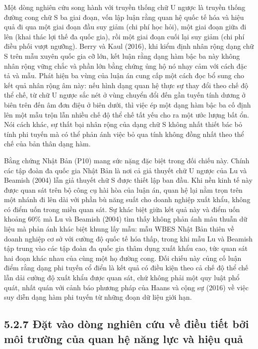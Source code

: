 \documentclass[
  a4paper,
  13pt]{extreport}
\begin{document}
Một dòng nghiên cứu song hành với truyền thống chữ U ngược là truyền
thống đường cong chữ S ba giai đoạn, vốn lập luận rằng quan hệ quốc tế
hóa và hiệu quả đi qua một giai đoạn đầu suy giảm (chi phí học hỏi), một
giai đoạn giữa đi lên (khai thác lợi thế đa quốc gia), rồi một giai đoạn
cuối lại suy giảm (chi phí điều phối vượt ngưỡng). Berry và Kaul (2016),
khi kiểm định nhân rộng dạng chữ S trên mẫu xuyên quốc gia cỡ lớn, kết
luận rằng dạng hàm bậc ba này không nhân rộng vững chắc và phần lớn bằng
chứng ủng hộ nó nhạy cảm với cách đặc tả và mẫu. Phát hiện ba vùng của
luận án cung cấp một cách đọc bổ sung cho kết quả nhân rộng âm này: nếu
hình dạng quan hệ thực sự thay đổi theo chế độ thể chế, từ chữ U ngược
sắc nét ở vùng chuyển đổi đến gần tuyến tính dương ở biên trên đến âm
đơn điệu ở biên dưới, thì việc ép một dạng hàm bậc ba cố định lên một
mẫu trộn lẫn nhiều chế độ thể chế tất yếu cho ra một ước lượng bất ổn.
Nói cách khác, sự thất bại nhân rộng của dạng chữ S không nhất thiết bác
bỏ tính phi tuyến mà có thể phản ánh việc bỏ qua tính không đồng nhất
theo thể chế của bản thân dạng hàm.

Bằng chứng Nhật Bản (P10) mang sức nặng đặc biệt trong đối chiếu này.
Chính các tập đoàn đa quốc gia Nhật Bản là nơi cả giả thuyết chữ U ngược
của Lu và Beamish (2004) lẫn giả thuyết chữ S được thiết lập ban đầu.
Khi nền kinh tế này được quan sát trên bộ công cụ hài hòa của luận án,
quan hệ lại nằm trọn trên một nhánh đi lên dài với phần bù năng suất cho
doanh nghiệp xuất khẩu, không có điểm uốn trong miền quan sát. Sự khác
biệt giữa kết quả này và điểm uốn khoảng 60\% mà Lu và Beamish (2004)
tìm thấy không phản ánh mâu thuẫn dữ liệu mà phản ánh khác biệt khung
lấy mẫu: mẫu WBES Nhật Bản thiên về doanh nghiệp cơ sở với cường độ quốc
tế hóa thấp, trong khi mẫu Lu và Beamish tập trung vào các tập đoàn đa
quốc gia thâm dụng xuất khẩu cao, tức quan sát hai đoạn khác nhau của
cùng một họ đường cong. Đối chiếu này củng cố luận điểm rằng dạng phi
tuyến cổ điển là kết quả có điều kiện theo cả chế độ thể chế lẫn dải
cường độ xuất khẩu được quan sát, chứ không phải một quy luật phổ quát,
nhất quán với cảnh báo phương pháp của Haans và cộng sự (2016) về việc
suy diễn dạng hàm phi tuyến từ những đoạn dữ liệu giới hạn.

\hypertarget{ux111ux1eb7t-vuxe0o-duxf2ng-nghiuxean-cux1ee9u-vux1ec1-ux111iux1ec1u-tiux1ebft-bux1edfi-muxf4i-trux1b0ux1eddng-cux1ee7a-quan-hux1ec7-nux103ng-lux1ef1c-vuxe0-hiux1ec7u-quux1ea3}{%
\subsection{5.2.7 Đặt vào dòng nghiên cứu về điều tiết bởi môi trường
của quan hệ năng lực và hiệu
quả}\label{ux111ux1eb7t-vuxe0o-duxf2ng-nghiuxean-cux1ee9u-vux1ec1-ux111iux1ec1u-tiux1ebft-bux1edfi-muxf4i-trux1b0ux1eddng-cux1ee7a-quan-hux1ec7-nux103ng-lux1ef1c-vuxe0-hiux1ec7u-quux1ea3}}
\end{document}
